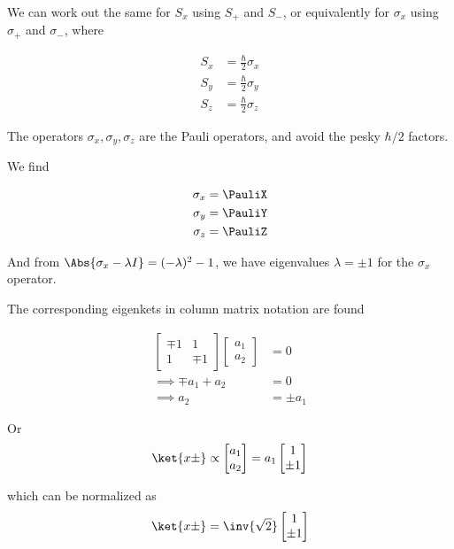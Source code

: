 We can work out the same for $S_x$ using $S_{+}$ and $S_{-}$, or equivalently for $\sigma_x$ using $\sigma_{+}$ and $\sigma_{-}$, where

\begin{align}\label{eqn:PHY356Foct19:2009}
S_x &= \frac{\hbar}{2} \sigma_x \\
S_y &= \frac{\hbar}{2} \sigma_y \\
S_z &= \frac{\hbar}{2} \sigma_z
\end{align}

The operators $\sigma_x, \sigma_y, \sigma_z$ are the Pauli operators, and avoid the pesky $\hbar/2$ factors.

We find

\begin{align}\label{eqn:PHY356Foct19:2010}
\sigma_x &= \PauliX \\
\sigma_y &= \PauliY \\
\sigma_z &= \PauliZ
\end{align}

And from $\Abs{\sigma_x - \lambda I} = (-\lambda)^2 -1$, we have eigenvalues $\lambda = \pm 1$ for the $\sigma_x$ operator.

The corresponding eigenkets in column matrix notation are found 

\begin{align*}
\begin{bmatrix}
\mp 1 & 1 \\
1 & \mp 1 
\end{bmatrix}
\begin{bmatrix}
a_1 \\
a_2 
\end{bmatrix}
&= 0 \\
\implies
\mp a_1 + a_2 &= 0 \\
\implies
a_2 &= \pm a_1
\end{align*}

Or
\begin{align*}
\ket{x\pm} \propto 
\begin{bmatrix}
a_1 \\
a_2 
\end{bmatrix}
=
a_1
\begin{bmatrix}
1 \\
\pm 1 
\end{bmatrix}
\end{align*}

which can be normalized as
\begin{align}\label{eqn:PHY356Foct19:2011}
\ket{x\pm} =
\inv{\sqrt{2}}
\begin{bmatrix}
1 \\
\pm 1 
\end{bmatrix}
\end{align}

